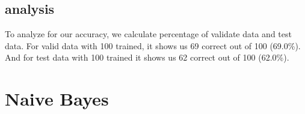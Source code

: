 \documentclass{article}
\begin{document}
    \subsection{analysis}
        To analyze for our accuracy, we calculate percentage of validate data and test data. \newline
        For valid data with 100 trained, it shows us 69 correct out of 100 (69.0\%). And for test data with 100 trained it shows us 62 correct out of 100 (62.0\%). \newline
        


\section{Naive Bayes}
\end{document}
